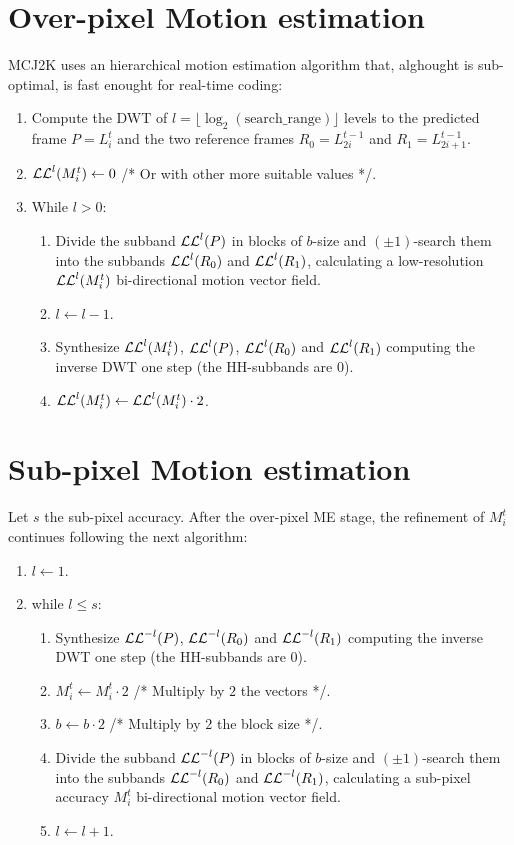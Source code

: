 \section{Over-pixel Motion estimation}
\noindent MCJ2K uses an hierarchical motion estimation algorithm that,
alghought is sub-optimal, is fast enought for real-time coding:
\begin{enumerate}
\item Compute the DWT of
  $l=\lfloor\log_2(\text{search\_range})\rfloor$ levels to the
  predicted frame $P=L^{t}_{i}$ and the two reference frames
  $R_0=L^{t-1}_{2i}$ and $R_1=L^{t-1}_{2i+1}$.
\item ${\cal LL}^l(M_i^t)\leftarrow 0$ /* Or with other more suitable
  values */.
\item While $l>0$:
  \begin{enumerate}
  \item Divide the subband ${\cal LL}^l(P)$ in blocks of $b$-size and
    $(\pm 1)$-search them into the subbands ${\cal LL}^l(R_0)$ and
    ${\cal LL}^l(R_1)$, calculating a low-resolution ${\cal
      LL}^l(M_i^t)$ bi-directional motion vector field.
  \item $l\leftarrow l-1$.
  \item Synthesize ${\cal LL}^l(M_i^t)$, ${\cal LL}^l(P)$, ${\cal
      LL}^l(R_0)$ and ${\cal LL}^l(R_1)$ computing the inverse DWT one
    step (the HH-subbands are $0$).
  \item ${\cal LL}^l(M_i^t)\leftarrow {\cal LL}^l(M_i^t)\cdot 2$.
  \end{enumerate}
\end{enumerate}

\section{Sub-pixel Motion estimation}
\noindent Let $s$ the sub-pixel accuracy. After the over-pixel ME
stage, the refinement of $M_i^t$ continues following the next
algorithm:

\begin{enumerate}
\item $l\leftarrow 1$.
\item while $l\le s$:
  \begin{enumerate}
  \item Synthesize ${\cal LL}^{-l}(P)$, ${\cal LL}^{-l}(R_0)$ and
    ${\cal LL}^{-l}(R_1)$ computing the inverse DWT one step (the
    HH-subbands are $0$).
  \item $M_i^t\leftarrow M_i^t\cdot 2$ /* Multiply by $2$ the vectors */.
  \item $b\leftarrow b\cdot 2$ /* Multiply by $2$ the block size */.
  \item Divide the subband ${\cal LL}^{-l}(P)$ in blocks of $b$-size
    and $(\pm 1)$-search them into the subbands ${\cal LL}^{-l}(R_0)$
    and ${\cal LL}^{-l}(R_1)$, calculating a sub-pixel accuracy
    $M_i^t$ bi-directional motion vector field.
  \item $l\leftarrow l+1$.
  \end{enumerate}
\end{enumerate}

